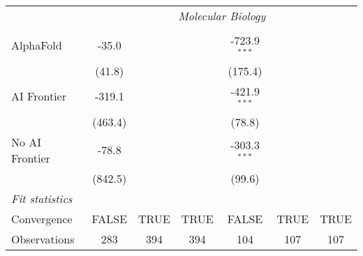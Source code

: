 \begin{tabular}{lcccccc}
 & \multicolumn{6}{c}{\textit{Molecular Biology}} \\ \\
   AlphaFold      & -35.0    &      &      & -723.9$^{***}$ &      &   \\   
                  & (41.8)   &      &      & (175.4)        &      &   \\   
   AI Frontier    & -319.1   &      &      & -421.9$^{***}$ &      &   \\   
                  & (463.4)  &      &      & (78.8)         &      &   \\   
   No AI Frontier & -78.8    &      &      & -303.3$^{***}$ &      &   \\   
                  & (842.5)  &      &      & (99.6)         &      &   \\   
   \midrule
   \emph{Fit statistics}\\
   Convergence    &FALSE     & TRUE & TRUE & FALSE          & TRUE & TRUE\\  
   Observations   & 283      & 394  & 394  & 104            & 107  & 107\\  
   

\end{tabular}
